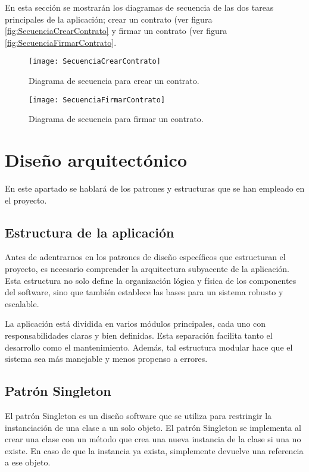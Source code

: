 En esta sección se mostrarán los diagramas de secuencia de las dos tareas principales de la aplicación; crear un contrato (ver figura \ref{fig:SecuenciaCrearContrato} y firmar un contrato (ver figura \ref{fig:SecuenciaFirmarContrato}.

\begin{figure}[h]
	\label{img:SecuenciaCrearContrato}
	\centering
	\texttt{[image: SecuenciaCrearContrato]}
	\caption[Diagrama secuencia creación contrato]{Diagrama de secuencia para crear un contrato.}
\end{figure}

\begin{figure}[h]
	\label{img:SecuenciaFirmarContrato}
	\centering
	\texttt{[image: SecuenciaFirmarContrato]}
	\caption[Diagrama secuencia firmar contrato]{Diagrama de secuencia para firmar un contrato.}
\end{figure}

\section{Diseño arquitectónico}

En este apartado se hablará de los patrones y estructuras que se han empleado en el proyecto.

\subsection{Estructura de la aplicación}

Antes de adentrarnos en los patrones de diseño específicos que estructuran el proyecto, es necesario comprender la arquitectura subyacente de la aplicación. 
Esta estructura no solo define la organización lógica y física de los componentes del software, sino que también establece las bases para un sistema robusto y escalable.

La aplicación está dividida en varios módulos principales, cada uno con responsabilidades claras y bien definidas. Esta separación facilita tanto el desarrollo como el mantenimiento. Además, tal estructura modular hace que el sistema sea más manejable y menos propenso a errores.

\subsection{Patrón Singleton}

El patrón Singleton es un diseño software que se utiliza para restringir la instanciación de una clase a un solo objeto. El patrón Singleton se implementa al crear una clase con un método que crea una nueva instancia de la clase si una no existe. En caso de que la instancia ya exista, simplemente devuelve una referencia a ese objeto.

